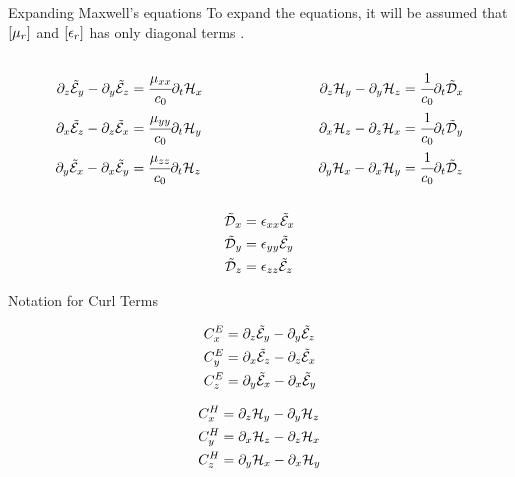 \documentclass[aspectratio=169]{beamer}
\begin{document}
\begin{frame}{Expanding Maxwell's equations}
  To expand the equations, it will be assumed that $\brackets{\mu_r}$ and $\brackets{\epsilon_r}$ has only diagonal terms \cite{rumpf_book}. 
  \begin{columns}
    \begin{column}{0.45\textwidth}
      \begin{align}
        \partial_z\tilde{\mathcal{E}}_y - \partial_y\tilde{\mathcal{E}}_z &= \cfrac{\mu_{xx}}{c_0} \partial_t \mathcal{H}_x \\
        \partial_x\tilde{\mathcal{E}}_z - \partial_z\tilde{\mathcal{E}}_x &= \cfrac{\mu_{yy}}{c_0} \partial_t \mathcal{H}_y\\
        \partial_y\tilde{\mathcal{E}}_x - \partial_x\tilde{\mathcal{E}}_y &= \cfrac{\mu_{zz}}{c_0} \partial_t \mathcal{H}_z
      \end{align}
    \end{column}
    \begin{column}{0.45\textwidth}
      \begin{align}
        \partial_z\mathcal{H}_y - \partial_y\mathcal{H}_z &= \cfrac{1}{c_0} \partial_t \tilde{\mathcal{D}}_x \\
        \partial_x\mathcal{H}_z - \partial_z\mathcal{H}_x &= \cfrac{1}{c_0} \partial_t \tilde{\mathcal{D}}_y \\
        \partial_y\mathcal{H}_x - \partial_x\mathcal{H}_y &= \cfrac{1}{c_0} \partial_t \tilde{\mathcal{D}}_z
    \end{align}

    \end{column}

  \end{columns}

  \begin{align}
      \tilde{\mathcal{D}}_x &= \epsilon_{xx} \tilde{\mathcal{E}}_x \label{eq:Dn_x}\\
      \tilde{\mathcal{D}}_y &= \epsilon_{yy} \tilde{\mathcal{E}}_y \label{eq:Dn_y}\\
      \tilde{\mathcal{D}}_z &= \epsilon_{zz} \tilde{\mathcal{E}}_z \label{eq:Dn_z}
  \end{align}
\end{frame}


\begin{frame}{Notation for Curl Terms}

  \begin{align}
    C_x^E &= \partial_z\tilde{\mathcal{E}}_y - \partial_y\tilde{\mathcal{E}}_z \\
    C_y^E &= \partial_x\tilde{\mathcal{E}}_z - \partial_z\tilde{\mathcal{E}}_x \\
    C_z^E &= \partial_y\tilde{\mathcal{E}}_x - \partial_x\tilde{\mathcal{E}}_y
  \end{align}

  \begin{align}
    C_x^H &= \partial_z\mathcal{H}_y - \partial_y\mathcal{H}_z \\
    C_y^H &= \partial_x\mathcal{H}_z - \partial_z\mathcal{H}_x \\
    C_z^H &= \partial_y\mathcal{H}_x - \partial_x\mathcal{H}_y
  \end{align}

\end{frame}
\end{document}
